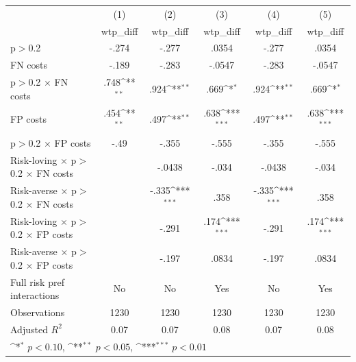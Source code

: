 {
\def\sym#1{\ifmmode^{#1}\else\(^{#1}\)\fi}
\begin{tabular}{l*{5}{c}}
\hline\hline
                &\multicolumn{1}{c}{(1)}&\multicolumn{1}{c}{(2)}&\multicolumn{1}{c}{(3)}&\multicolumn{1}{c}{(4)}&\multicolumn{1}{c}{(5)}\\
                &\multicolumn{1}{c}{wtp\_diff}&\multicolumn{1}{c}{wtp\_diff}&\multicolumn{1}{c}{wtp\_diff}&\multicolumn{1}{c}{wtp\_diff}&\multicolumn{1}{c}{wtp\_diff}\\
\hline
p$>$0.2         &    -.274         &    -.277         &    .0354         &    -.277         &    .0354         \\
FN costs        &    -.189         &    -.283         &   -.0547         &    -.283         &   -.0547         \\
p$>$0.2 $\times$ FN costs&     .748\sym{**} &     .924\sym{**} &     .669\sym{*}  &     .924\sym{**} &     .669\sym{*}  \\
FP costs        &     .454\sym{**} &     .497\sym{**} &     .638\sym{***}&     .497\sym{**} &     .638\sym{***}\\
p$>$0.2 $\times$ FP costs&     -.49         &    -.355         &    -.555         &    -.355         &    -.555         \\
Risk-loving $\times$ p$>$0.2 $\times$ FN costs&                  &   -.0438         &    -.034         &   -.0438         &    -.034         \\
Risk-averse $\times$ p$>$0.2 $\times$ FN costs&                  &    -.335\sym{***}&     .358         &    -.335\sym{***}&     .358         \\
Risk-loving $\times$ p$>$0.2 $\times$ FP costs&                  &    -.291         &     .174\sym{***}&    -.291         &     .174\sym{***}\\
Risk-averse $\times$ p$>$0.2 $\times$ FP costs&                  &    -.197         &    .0834         &    -.197         &    .0834         \\
Full risk pref interactions&       No         &       No         &      Yes         &       No         &      Yes         \\
\hline
Observations    &     1230         &     1230         &     1230         &     1230         &     1230         \\
Adjusted \(R^{2}\)&     0.07         &     0.07         &     0.08         &     0.07         &     0.08         \\
\hline\hline
\multicolumn{6}{l}{\footnotesize \sym{*} \(p<0.10\), \sym{**} \(p<0.05\), \sym{***} \(p<0.01\)}\\
\end{tabular}
}

